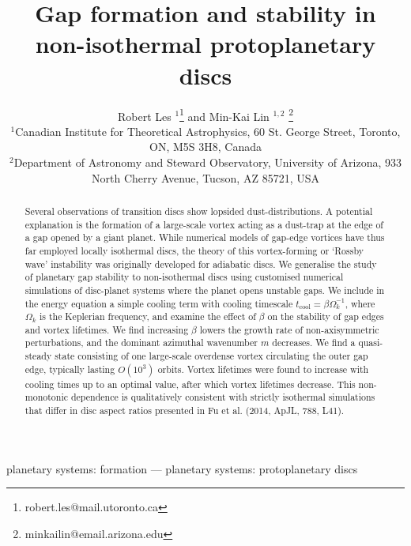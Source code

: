 \documentclass[useAMS,usenatbib]{mn2e}
\title[Gaps in non-isothermal discs]{Gap formation and stability in 
  non-isothermal protoplanetary discs}
\author[Les and Lin]{Robert Les
  $^1$\thanks{robert.les@mail.utoronto.ca} and Min-Kai Lin $^{1,2}$
  \thanks{ minkailin@email.arizona.edu} \\ 
$^1$Canadian Institute for Theoretical Astrophysics,  
60 St. George Street, Toronto, ON, M5S 3H8, Canada \\
$^2$Department of Astronomy and Steward Observatory, University of
Arizona, 933 North Cherry Avenue, Tucson, AZ 85721, USA 
}
\begin{document}
\maketitle
\begin{abstract}
Several observations of transition discs show lopsided
dust-distributions. A potential explanation is the formation of a
large-scale vortex acting as a dust-trap at the edge of a gap opened
by a giant planet. While numerical models of gap-edge vortices have
thus far employed locally isothermal discs, the 
theory of this vortex-forming or `Rossby wave' instability was
originally developed for adiabatic discs.  
We generalise the study of planetary gap stability to non-isothermal
discs using customised numerical simulations of disc-planet
systems where the planet opens unstable gaps. 
We include in the energy equation a simple cooling term with
cooling timescale $t_\mathrm{cool}=\beta\Omega_k^{-1}$, where $\Omega_k$ is
the Keplerian frequency, and examine the effect of $\beta$ on the
stability of gap edges and vortex lifetimes. We find increasing
$\beta$ lowers the growth rate of non-axisymmetric perturbations, and the
dominant azimuthal wavenumber $m$ decreases.  
We find a quasi-steady state consisting of one  
large-scale overdense vortex circulating the outer gap edge, typically  
lasting $O(10^3)$ orbits.  
Vortex lifetimes were found to increase with cooling times up to an
optimal value, after which vortex lifetimes decrease. This
non-monotonic dependence is qualitatively consistent with 
strictly isothermal simulations that differ in disc aspect ratios
presented in Fu et al. (2014, ApJL, 788, L41). 


   


\end{abstract}

\begin{keywords}
planetary systems: formation --- planetary systems:
protoplanetary discs
\end{keywords}
\end{document}
